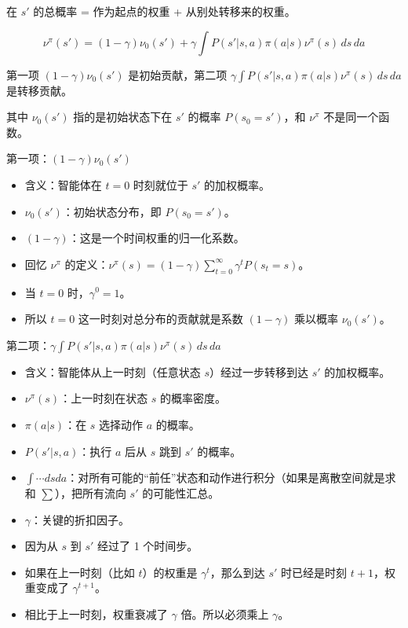 在 \(s'\) 的总概率 = 作为起点的权重 + 从别处转移来的权重。

\[
\nu^\pi(s') = (1-\gamma)\nu_0(s') + \gamma\int P(s'|s,a)\pi(a|s)\nu^\pi(s)\,ds\,da
\]

第一项 \((1-\gamma)\nu_0(s')\) 是初始贡献，第二项 \(\gamma\int P(s'|s,a)\pi(a|s)\nu^\pi(s)\,ds\,da\) 是转移贡献。

其中 \(\nu_0(s')\) 指的是初始状态下在 \(s'\) 的概率 \(P(s_0=s')\)，和 \(\nu^\pi\) 不是同一个函数。

第一项：\((1-\gamma)\nu_0(s')\)

\begin{itemize}
\tightlist
\item
  含义：智能体在 \(t=0\) 时刻就位于 \(s'\) 的加权概率。
\item
  \(\nu_0(s')\)：初始状态分布，即 \(P(s_0=s')\)。
\item
  \((1-\gamma)\)：这是一个时间权重的归一化系数。
\item
  回忆 \(\nu^\pi\) 的定义：\(\nu^\pi(s)=(1-\gamma)\sum_{t=0}^{\infty}\gamma^t P(s_t=s)\)。
\item
  当 \(t=0\) 时，\(\gamma^0=1\)。
\item
  所以 \(t=0\) 这一时刻对总分布的贡献就是系数 \((1-\gamma)\) 乘以概率 \(\nu_0(s')\)。
\end{itemize}

第二项：\(\gamma\int P(s'|s,a)\pi(a|s)\nu^\pi(s)\,ds\,da\)

\begin{itemize}
\tightlist
\item
  含义：智能体从上一时刻（任意状态 \(s\)）经过一步转移到达 \(s'\) 的加权概率。
\item
  \(\nu^\pi(s)\)：上一时刻在状态 \(s\) 的概率密度。
\item
  \(\pi(a|s)\)：在 \(s\) 选择动作 \(a\) 的概率。
\item
  \(P(s'|s,a)\)：执行 \(a\) 后从 \(s\) 跳到 \(s'\) 的概率。
\item
  \(\int \cdots dsda\)：对所有可能的``前任''状态和动作进行积分（如果是离散空间就是求和 \(\sum\)），把所有流向 \(s'\) 的可能性汇总。
\item
  \(\gamma\)：关键的折扣因子。
\item
  因为从 \(s\) 到 \(s'\) 经过了 1 个时间步。
\item
  如果在上一时刻（比如 \(t\)）的权重是 \(\gamma^t\)，那么到达 \(s'\) 时已经是时刻 \(t+1\)，权重变成了 \(\gamma^{t+1}\)。
\item
  相比于上一时刻，权重衰减了 \(\gamma\) 倍。所以必须乘上 \(\gamma\)。
\end{itemize}

